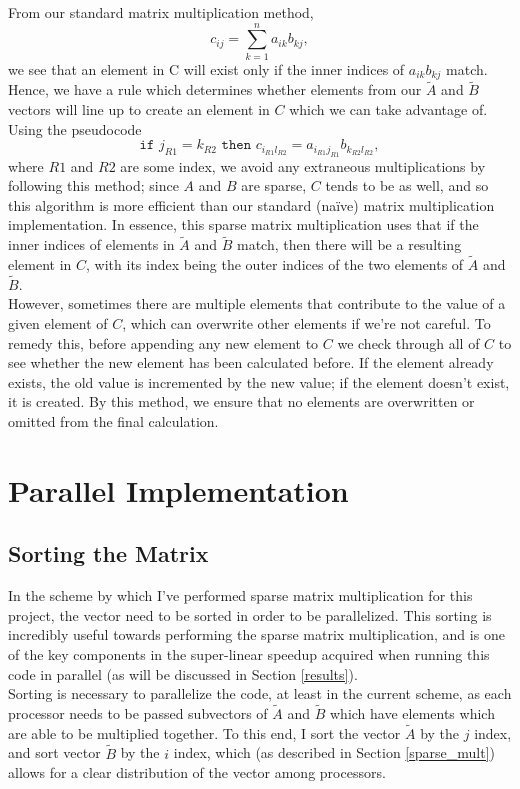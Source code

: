 \documentclass{article}
\begin{document}
From our standard matrix multiplication method, 
$$c_{i j} = \sum_{k=1}^n a_{ik} b_{kj},$$ we see that an element in C will exist
only if the inner indices of $a_{ik}b_{kj}$ match. Hence, we have a rule which
determines whether elements from our $\tilde{A}$ and $\tilde{B}$ vectors will
line up to create an element in $C$ which we can take advantage of. Using the
pseudocode $$\texttt{if $j_{R1} = k_{R2}$ then  } c_{i_{R1}l_{R2}} =
a_{i_{R1}j_{R1}}b_{k_{R2}l_{R2}},$$ where $R1$ and $R2$ are some index, 
we avoid any extraneous multiplications by following this method;
since $A$ and $B$ are sparse, $C$ tends to be as well, and so this algorithm is
more efficient than our standard (na\"{i}ve) matrix multiplication
implementation. In essence, this sparse matrix multiplication uses that if the
inner indices of elements in $\tilde{A}$ and $\tilde{B}$ match, then there will
be a resulting element in $C$, with its index being the outer indices of the two
elements of $\tilde{A}$ and $\tilde{B}$. \\

However, sometimes there are multiple elements that contribute to the value of a
given element of $C$, which can overwrite other elements if we're not careful.
To remedy this, before appending any new element to $C$ we check through all of
$C$ to see whether the new element has been calculated before. If the element
already exists, the old value is incremented by the new value; if the element
doesn't exist, it is created. By this method, we ensure that no elements are
overwritten or omitted from the final calculation. 

\section{Parallel Implementation}\label{parallel}
\subsection{Sorting the Matrix}
In the scheme by which I've performed sparse matrix multiplication for this
project, the vector need to be sorted in order to be parallelized.  This sorting
is incredibly useful towards performing the sparse matrix multiplication, and is
one of the key components in the super-linear speedup acquired when running this
code in parallel (as will be discussed in Section \ref{results}). \\

Sorting is necessary to parallelize the code, at least in the current scheme, as
each processor needs to be passed subvectors of $\tilde{A}$ and $\tilde{B}$
which have elements which are able to be multiplied together. To this end, I
sort the vector $\tilde{A}$ by the $j$ index, and sort vector $\tilde{B}$ by the
$i$ index, which (as described in Section \ref{sparse_mult}) allows for a clear
distribution of the vector among processors. \\
\end{document}
